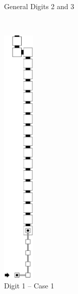 \begin{itemize}
\begin{figure}[H]
\begin{subfigure}[t]{0.17\textwidth}
                \caption{\label{fig:post_warp_general_digit2and3} General Digits 2 and 3 }
            \end{subfigure}%
            ~
            \begin{subfigure}[t]{0.17\textwidth}
                \centering
                \includegraphics[width=0.17\textwidth]{warping_post_warp_case1_digit1_msr}
                \caption{\label{fig:post_warp_case1_digit1_msr} Digit 1 -- Case 1}
            \end{subfigure}%
            ~
            \begin{subfigure}[t]{0.17\textwidth}
                \centering

\end{subfigure}
\end{figure}
\end{itemize}
